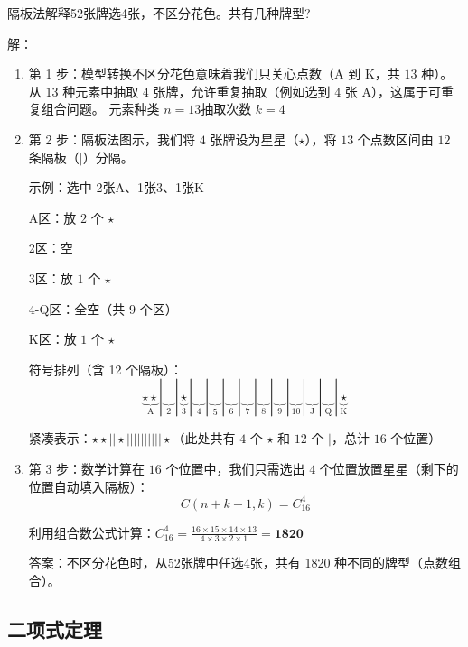 \begin{example}
  隔板法解释52张牌选4张，不区分花色。共有几种牌型?

  解：
  \begin{enumerate}
    \item 第 1 步：模型转换不区分花色意味着我们只关心点数（A 到 K，共 \(13\) 种）。
  从 \(13\) 种元素中抽取 \(4\) 张牌，允许重复抽取（例如选到 \(4\) 张 A），这属于可重复组合问题。
  元素种类 \(n=13\)抽取次数 \(k=4\)
    \item 第 2 步：隔板法图示，我们将 \(4\) 张牌设为星星（\(\star \)），将 \(13\) 个点数区间由 \(12\) 条隔板（\(|\)）分隔。
      
      示例：选中 2张A、1张3、1张K

      A区：放 \(2\) 个 \(\star \)

      2区：空

      3区：放 \(1\) 个 \(\star \)

      4-Q区：全空（共 \(9\) 个区）

      K区：放 \(1\) 个 \(\star \)

      符号排列（含 12 个隔板）：
      \[\underbrace{\star \star }_{\text{A}}|\underbrace{\quad }_{\text{2}}|\underbrace{\star }_{\text{3}}|\underbrace{\quad }_{\text{4}}|\underbrace{\quad }_{\text{5}}|\underbrace{\quad }_{\text{6}}|\underbrace{\quad }_{\text{7}}|\underbrace{\quad }_{\text{8}}|\underbrace{\quad }_{\text{9}}|\underbrace{\quad }_{\text{10}}|\underbrace{\quad }_{\text{J}}|\underbrace{\quad }_{\text{Q}}|\underbrace{\star }_{\text{K}}\]

      紧凑表示：\(\star \star ||\star ||||||||||\star \)（此处共有 \(4\) 个 \(\star \) 和 \(12\) 个 \(|\)，总计 \(16\) 个位置）

    \item 第 3 步：数学计算在 \(16\) 个位置中，我们只需选出 \(4\) 个位置放置星星（剩下的位置自动填入隔板）：
      \[C(n+k-1,k)={C_{16}^{4}}\]

      利用组合数公式计算：\({C_{16}^{4}}=\frac{16 \times 15 \times 14 \times 13}{4 \times 3 \times 2 \times 1}=\mathbf{1820}\)

      答案：不区分花色时，从52张牌中任选4张，共有 1820 种不同的牌型（点数组合）。

  \end{enumerate}

\end{example}

\subsection{二项式定理}
\label{sec:binomial-theorem}

